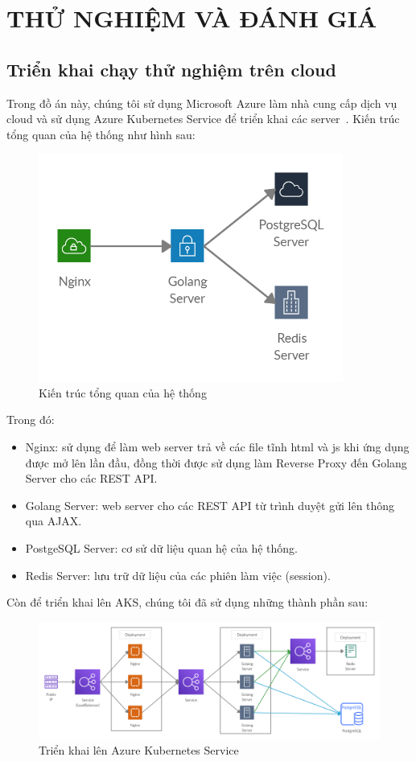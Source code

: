 \chapter{THỬ NGHIỆM VÀ ĐÁNH GIÁ}
\section{Triển khai chạy thử nghiệm trên cloud}
Trong đồ án này, chúng tôi sử dụng Microsoft Azure làm nhà cung cấp dịch vụ
cloud và sử dụng Azure Kubernetes Service
để triển khai các server~\cite{kubeazure:online}.
Kiến trúc tổng quan của hệ thống như hình sau:
\begin{figure}[H]
\centering
\includegraphics[width=10cm]{images/architecture.png}
\caption{Kiến trúc tổng quan của hệ thống}
\end{figure}
Trong đó:
\begin{itemize}[topsep=0ex]
\item Nginx: sử dụng để làm web server trả về các file tĩnh html và js khi
ứng dụng được mở lên lần đầu, đồng thời được sử dụng làm Reverse Proxy đến
Golang Server cho các REST API.

\item Golang Server: web server cho các REST API từ trình duyệt gửi lên
thông qua AJAX.

\item PostgeSQL Server: cơ sử dữ liệu quan hệ của hệ thống.

\item Redis Server: lưu trữ dữ liệu của các phiên làm việc (session).
\end{itemize}

Còn để triển khai lên AKS, chúng tôi đã sử dụng những thành phần sau:
\begin{figure}[H]
\centering
\includegraphics[width=\textwidth]{images/deploy.png}
\caption{Triển khai lên Azure Kubernetes Service}
\end{figure}

